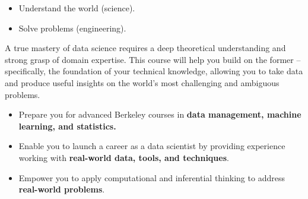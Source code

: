\documentclass[
  letterpaper,
  DIV=11,
  numbers=noendperiod]{scrreprt}
\providecommand{\tightlist}{%
  \setlength{\itemsep}{0pt}\setlength{\parskip}{0pt}}\usepackage{longtable,booktabs,array}
\begin{document}
\begin{itemize}
\tightlist
\item
  Understand the world (science).
\item
  Solve problems (engineering).
\end{itemize}

A true mastery of data science requires a deep theoretical understanding
and strong grasp of domain expertise. This course will help you build on
the former -- specifically, the foundation of your technical knowledge,
allowing you to take data and produce useful insights on the world's
most challenging and ambiguous problems.

\begin{tcolorbox}[enhanced jigsaw, colback=white, opacityback=0, coltitle=black, title=\textcolor{quarto-callout-note-color}{\faInfo}\hspace{0.5em}{Course Goals}, bottomtitle=1mm, breakable, titlerule=0mm, left=2mm, colbacktitle=quarto-callout-note-color!10!white, toptitle=1mm, arc=.35mm, bottomrule=.15mm, leftrule=.75mm, rightrule=.15mm, toprule=.15mm, opacitybacktitle=0.6, colframe=quarto-callout-note-color-frame]

\begin{itemize}
\tightlist
\item
  Prepare you for advanced Berkeley courses in \textbf{data management,
  machine learning, and statistics.}
\item
  Enable you to launch a career as a data scientist by providing
  experience working with \textbf{real-world data, tools, and
  techniques}.
\item
  Empower you to apply computational and inferential thinking to address
  \textbf{real-world problems}.
\end{itemize}

\end{tcolorbox}
\end{document}
